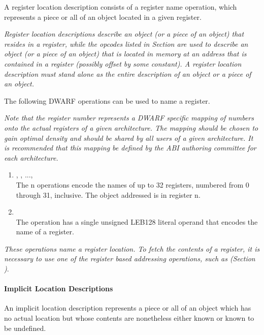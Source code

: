 A register location description consists of a register name
operation, which represents a piece or all of an object
located in a given register.

\textit{Register location descriptions describe an object
(or a piece of an object) that resides in a register, while
the opcodes listed in 
Section 
are used to describe an object (or a piece of
an object) that is located in memory at an address that is
contained in a register (possibly offset by some constant). A
register location description must stand alone as the entire
description of an object or a piece of an object.
}

The following DWARF operations can be used to name a register.


\textit{Note that the register number represents a DWARF specific
mapping of numbers onto the actual registers of a given
architecture. The mapping should be chosen to gain optimal
density and should be shared by all users of a given
architecture. It is recommended that this mapping be defined
by the ABI authoring committee for each architecture.
}
\begin{enumerate}[1]
\item {}, , ...,  \\
The n operations encode the names of up to 32
registers, numbered from 0 through 31, inclusive. The object
addressed is in register n.

\item {} \\
The  operation has a single unsigned LEB128 literal
operand that encodes the name of a register.  
\end{enumerate}

\textit{These operations name a register location. To
fetch the contents of a register, it is necessary to use
one of the register based addressing operations, such as
(Section )}.


\paragraph{Implicit Location Descriptions}

An implicit location description represents a piece or all
of an object which has no actual location but whose contents
are nonetheless either known or known to be undefined.

